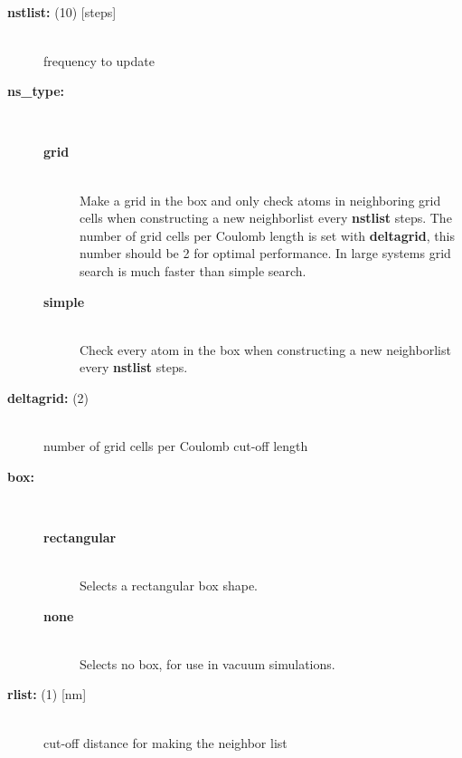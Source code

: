 \subsection{}
\begin{description}
\item[{\bf nstlist: }(10) {[steps]}]\mbox{}\\
frequency to update 
\item[{\bf ns\_type:}]\mbox{}\\
\vspace{-2ex}\begin{description}
\item[{\bf grid}]\mbox{}\\
Make a grid in the box and only check atoms in neighboring grid
cells when constructing a new neighborlist every {\bf nstlist} steps.
The number of grid cells per Coulomb 
length is set with {\bf deltagrid}, this number should be 2 for
optimal performance.  In large systems grid search is much faster than
simple search.
\item[{\bf simple}]\mbox{}\\
Check every atom in the box when constructing a new neighborlist
every {\bf nstlist} steps.
\end{description}
\item[{\bf deltagrid: }(2)]\mbox{}\\
number of grid cells per Coulomb cut-off length
\item[{\bf box:}]\mbox{}\\
\vspace{-2ex}\begin{description}
\item[{\bf rectangular}]\mbox{}\\
Selects a rectangular box shape.
\item[{\bf none}]\mbox{}\\
Selects no box, for use in vacuum simulations.
\end{description}
\item[{\bf rlist: }(1) {[nm]}]\mbox{}\\
cut-off distance for making the neighbor list
\end{description}

